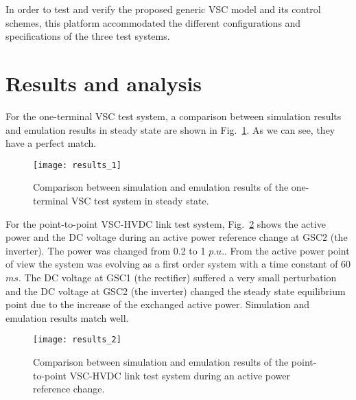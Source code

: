 \documentclass[conference]{IEEEtran}
\begin{document}
In order to test and verify the proposed generic VSC model and its control schemes, this platform accommodated the different configurations and specifications of the three test systems.
\section{Results and analysis}
For the one-terminal VSC test system, a comparison between simulation results and emulation results in steady state are shown in Fig.~\ref{results_1}. As we can see, they have a perfect match. 
\begin{figure}[!ht]
\centering
\texttt{[image: results\_1]}
\caption{Comparison between simulation and emulation results of the one-terminal VSC test system in steady state.}
\label{results_1}
\end{figure}

For the point-to-point VSC-HVDC link test system, Fig.~\ref{results_2} shows the active power and the DC voltage during an active power reference change at GSC2 (the inverter). The power was changed from 0.2 to 1 $p.u.$. From the active power point of view the system was evolving as a first order system with a time constant of 60 $ms$. The DC voltage at GSC1 (the rectifier) suffered a very small perturbation and the DC voltage at GSC2 (the inverter) changed the steady state equilibrium point due to the increase of the exchanged active power. Simulation and emulation results match well.
\begin{figure}[!ht]
\centering
\texttt{[image: results\_2]}
\caption{Comparison between simulation and emulation results of the point-to-point VSC-HVDC link test system during an active power reference change.}
\label{results_2}
\end{figure}
\end{document}

